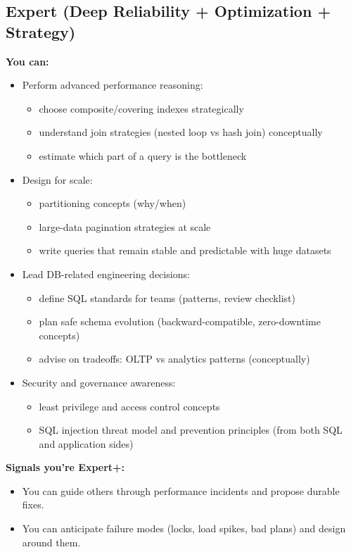 \subsection{Expert (Deep Reliability + Optimization + Strategy)}
\textbf{You can:}
\begin{itemize}
    \item Perform advanced performance reasoning:
    \begin{itemize}
        \item choose composite/covering indexes strategically
        \item understand join strategies (nested loop vs hash join) conceptually
        \item estimate which part of a query is the bottleneck
    \end{itemize}
    \item Design for scale:
    \begin{itemize}
        \item partitioning concepts (why/when)
        \item large-data pagination strategies at scale
        \item write queries that remain stable and predictable with huge datasets
    \end{itemize}
    \item Lead DB-related engineering decisions:
    \begin{itemize}
        \item define SQL standards for teams (patterns, review checklist)
        \item plan safe schema evolution (backward-compatible, zero-downtime concepts)
        \item advise on tradeoffs: OLTP vs analytics patterns (conceptually)
    \end{itemize}
    \item Security and governance awareness:
    \begin{itemize}
        \item least privilege and access control concepts
        \item SQL injection threat model and prevention principles (from both SQL and application 
        sides)
    \end{itemize}
\end{itemize}

\textbf{Signals you're Expert+:}
\begin{itemize}
    \item You can guide others through performance incidents and propose durable fixes.
    \item You can anticipate failure modes (locks, load spikes, bad plans) and design around them.
\end{itemize}